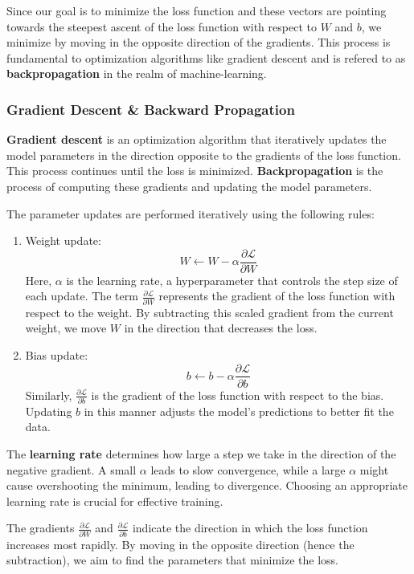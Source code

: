 Since our goal is to minimize the loss function and these vectors are pointing towards the steepest ascent of the loss function with respect to $W$ and $b$, we minimize by moving in the opposite direction of the gradients. This process is fundamental to optimization algorithms like gradient descent and is refered to as \textbf{backpropagation} in the realm of machine-learning.

\subsubsection{Gradient Descent \& Backward Propagation}
\label{subsubsec:2}
\textbf{Gradient descent} is an optimization algorithm that iteratively updates the model parameters in the direction opposite to the gradients of the loss function. This process continues until the loss is minimized. \textbf{Backpropagation} is the process of computing these gradients and updating the model parameters.

The parameter updates are performed iteratively using the following rules:
\begin{enumerate}
    \item  Weight update:
    $$W \leftarrow W - \alpha \frac{\partial \mathcal{L}}{\partial W}$$
   Here, $\alpha$ is the learning rate, a hyperparameter that controls the step size of each update. The term $\frac{\partial \mathcal{L}}{\partial W}$ represents the gradient of the loss function with respect to the weight. By subtracting this scaled gradient from the current weight, we move $ W $ in the direction that decreases the loss.

    \item Bias update:
    $$b \leftarrow b - \alpha \frac{\partial \mathcal{L}}{\partial b}$$
    Similarly, $\frac{\partial \mathcal{L}}{\partial b}$ is the gradient of the loss function with respect to the bias. Updating $b$ in this manner adjusts the model's predictions to better fit the data.
\end{enumerate}

The \textbf{learning rate} determines how large a step we take in the direction of the negative gradient. A small $\alpha$ leads to slow convergence, while a large $\alpha$ might cause overshooting the minimum, leading to divergence. Choosing an appropriate learning rate is crucial for effective training.

The gradients $\frac{\partial \mathcal{L}}{\partial W}$ and $\frac{\partial \mathcal{L}}{\partial b}$ indicate the direction in which the loss function increases most rapidly. By moving in the opposite direction (hence the subtraction), we aim to find the parameters that minimize the loss.

